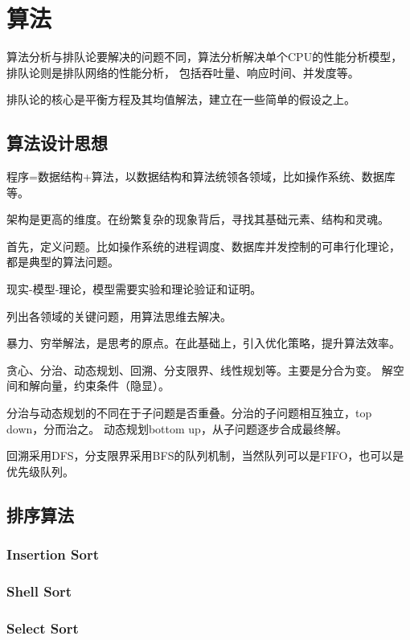 \chapter{算法}

算法分析与排队论要解决的问题不同，算法分析解决单个CPU的性能分析模型，排队论则是排队网络的性能分析，
包括吞吐量、响应时间、并发度等。

排队论的核心是平衡方程及其均值解法，建立在一些简单的假设之上。

\section{算法设计思想}

程序=数据结构+算法，以数据结构和算法统领各领域，比如操作系统、数据库等。

架构是更高的维度。在纷繁复杂的现象背后，寻找其基础元素、结构和灵魂。

首先，定义问题。比如操作系统的进程调度、数据库并发控制的可串行化理论，
都是典型的算法问题。

现实-模型-理论，模型需要实验和理论验证和证明。

列出各领域的关键问题，用算法思维去解决。

暴力、穷举解法，是思考的原点。在此基础上，引入优化策略，提升算法效率。

贪心、分治、动态规划、回溯、分支限界、线性规划等。主要是分合为变。
解空间和解向量，约束条件（隐显）。

分治与动态规划的不同在于子问题是否重叠。分治的子问题相互独立，top down，分而治之。
动态规划bottom up，从子问题逐步合成最终解。

回溯采用DFS，分支限界采用BFS的队列机制，当然队列可以是FIFO，也可以是优先级队列。

\section{排序算法}

\subsection{Insertion Sort}

\subsection{Shell Sort}

\subsection{Select Sort}

